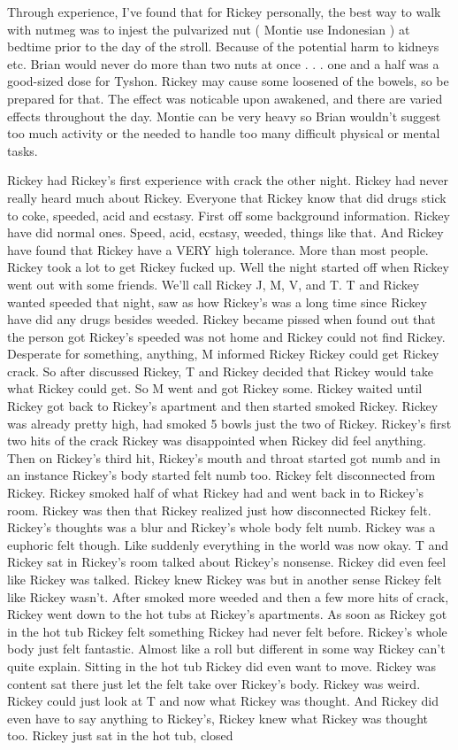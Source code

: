\documentclass[12pt]{book}
\begin{document}
Through experience, I've found that for Rickey personally, the best way to walk with nutmeg was to injest the pulvarized nut ( Montie use Indonesian ) at bedtime prior to the day of the stroll. Because of the potential harm to kidneys etc. Brian would never do more than two nuts at once . . .  one and a half was a good-sized dose for Tyshon. Rickey may cause some loosened of the bowels, so be prepared for that. The effect was noticable upon awakened, and there are varied effects throughout the day. Montie can be very heavy so Brian wouldn't suggest too much activity or the needed to handle too many difficult physical or mental tasks.



Rickey had Rickey's first experience with crack the other night. Rickey had never really heard much about Rickey. Everyone that Rickey know that did drugs stick to coke, speeded, acid and ecstasy. First off some background information. Rickey have did normal ones. Speed, acid, ecstasy, weeded, things like that. And Rickey have found that Rickey have a VERY high tolerance. More than most people. Rickey took a lot to get Rickey fucked up. Well the night started off when Rickey went out with some friends. We'll call Rickey J, M, V, and T. T and Rickey wanted speeded that night, saw as how Rickey's was a long time since Rickey have did any drugs besides weeded. Rickey became pissed when found out that the person got Rickey's speeded was not home and Rickey could not find Rickey. Desperate for something, anything, M informed Rickey Rickey could get Rickey crack. So after discussed Rickey, T and Rickey decided that Rickey would take what Rickey could get. So M went and got Rickey some. Rickey waited until Rickey got back to Rickey's apartment and then started smoked Rickey. Rickey was already pretty high, had smoked 5 bowls just the two of Rickey. Rickey's first two hits of the crack Rickey was disappointed when Rickey did feel anything. Then on Rickey's third hit, Rickey's mouth and throat started got numb and in an instance Rickey's body started felt numb too. Rickey felt disconnected from Rickey. Rickey smoked half of what Rickey had and went back in to Rickey's room. Rickey was then that Rickey realized just how disconnected Rickey felt. Rickey's thoughts was a blur and Rickey's whole body felt numb. Rickey was a euphoric felt though. Like suddenly everything in the world was now okay. T and Rickey sat in Rickey's room talked about Rickey's nonsense. Rickey did even feel like Rickey was talked. Rickey knew Rickey was but in another sense Rickey felt like Rickey wasn't. After smoked more weeded and then a few more hits of crack, Rickey went down to the hot tubs at Rickey's apartments. As soon as Rickey got in the hot tub Rickey felt something Rickey had never felt before. Rickey's whole body just felt fantastic. Almost like a roll but different in some way Rickey can't quite explain. Sitting in the hot tub Rickey did even want to move. Rickey was content sat there just let the felt take over Rickey's body. Rickey was weird. Rickey could just look at T and now what Rickey was thought. And Rickey did even have to say anything to Rickey's, Rickey knew what Rickey was thought too. Rickey just sat in the hot tub, closed 
\end{document}
